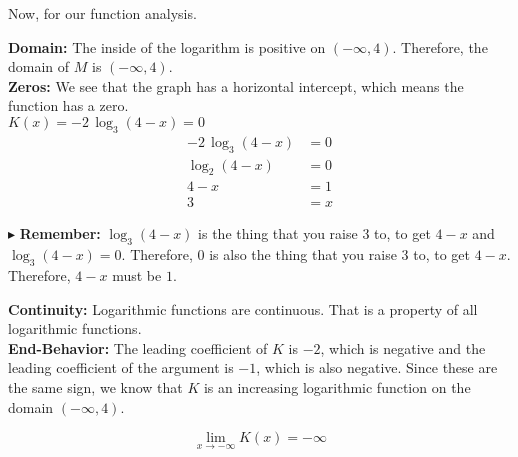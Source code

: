 \documentclass{ximera}
\begin{document}
\begin{example}
\begin{explanation}
\begin{image}
\end{image}


\end{explanation}





Now, for our function analysis.

\begin{explanation}



\textbf{Domain:}  The inside of the logarithm is positive on $(-\infty, 4)$.  Therefore, the domain of $M$ is $(-\infty, 4)$. \\


\textbf{Zeros:}  We see that the graph has a horizontal intercept, which means the function has a zero. \\


$K(x) = -2 \, \log_3(4 - x) = 0$ \\


\begin{align*}
-2 \, \log_3(4 - x) & = 0 \\
\log_2(4 - x) & = 0 \\
4 - x & = 1 \\
3 & = x 
\end{align*}


$\blacktriangleright$ \textbf{Remember:} $\log_3(4 - x)$ is the thing that you raise $3$ to, to get $4 - x$ and $\log_3(4 - x) = 0$.  Therefore, $0$ is also the thing that you raise $3$ to, to get $4 - x$. Therefore, $4 - x$ must be $1$.




\textbf{Continuity:}  Logarithmic functions are continuous.  That is a property of all logarithmic functions. \\


\textbf{End-Behavior:} The leading coefficient of $K$ is $-2$, which is negative and the leading coefficient of the argument is $-1$, which is also negative.  Since these are the same sign, we know that $K$ is an increasing logarithmic function on the domain $(-\infty, 4)$.


\[
\lim\limits_{x \to -\infty} K(x) = -\infty
\]




\end{explanation}
\end{example}
\end{document}
